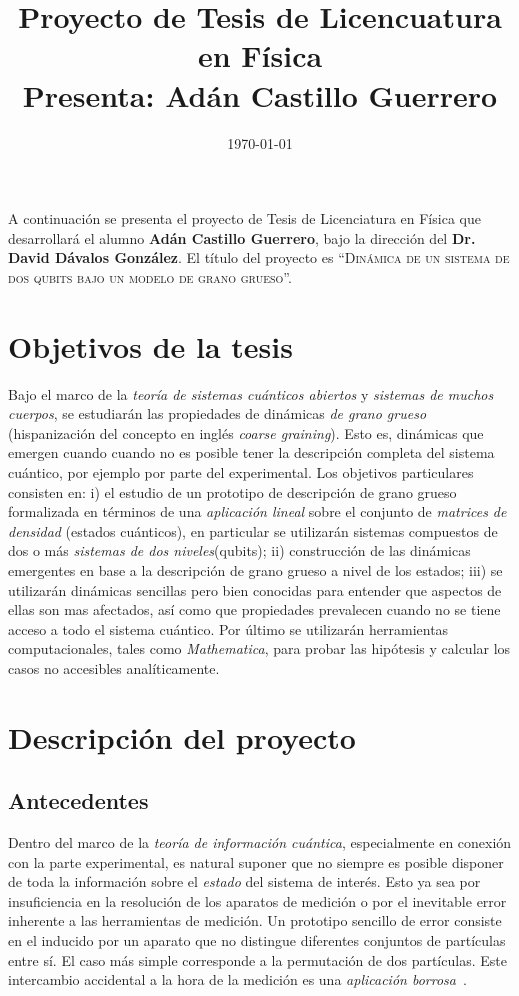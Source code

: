 \documentclass[10pt]{article}
\title{Proyecto de Tesis de Licencuatura en Física\\ {\large Presenta: Adán Castillo Guerrero}}
\date{\today}
\begin{document}
\maketitle
\thispagestyle{empty}
A continuación se presenta el proyecto de Tesis de Licenciatura en Física que desarrollará el alumno \textbf{Adán Castillo Guerrero}, bajo la dirección del \textbf{Dr. David Dávalos González}. El título del proyecto es ``\textsc{Dinámica de un sistema de dos qubits bajo un modelo de grano grueso}''.

\section{Objetivos de la tesis}
Bajo el marco de la \textit{teoría de sistemas cuánticos abiertos} y \textit{sistemas de muchos cuerpos}, se estudiarán las propiedades de dinámicas \textit{de grano grueso} (hispanización del concepto en inglés \textit{coarse graining}). Esto es, dinámicas que emergen cuando cuando no es posible tener la descripción completa del sistema cuántico, por ejemplo por parte del experimental. Los objetivos particulares consisten en: i) el estudio de un prototipo de descripción de grano grueso formalizada en términos de una \textit{aplicación lineal} sobre el conjunto de \textit{matrices de densidad} (estados cuánticos), en particular se utilizarán sistemas compuestos de dos o más \textit{sistemas de dos niveles}(qubits); ii) construcción de las dinámicas emergentes en base a la descripción de grano grueso a nivel de los estados; iii) se utilizarán dinámicas sencillas pero bien conocidas para entender que aspectos de ellas son mas afectados, así como que propiedades prevalecen cuando no se tiene acceso a todo el sistema cuántico. Por último se utilizarán herramientas computacionales, tales como \textit{Mathematica}, para probar las hipótesis y calcular los casos no accesibles analíticamente.

\section{Descripción del proyecto}

\subsection{Antecedentes}
Dentro del marco de la \textit{teoría de información cuántica}, especialmente en conexión con la parte experimental, es natural suponer que no siempre es posible disponer de toda la información sobre el \textit{estado} del sistema de interés. Esto ya sea por insuficiencia en la resolución de los aparatos de medición o por el inevitable error inherente a las herramientas de medición. Un prototipo sencillo de error consiste en el inducido por un aparato que no distingue diferentes conjuntos de partículas entre sí. El caso más simple corresponde a la permutación de dos partículas. Este intercambio accidental a la hora de la medición es una \textit{aplicación borrosa}~\cite{FuzzyMeasurements}.
\end{document}
